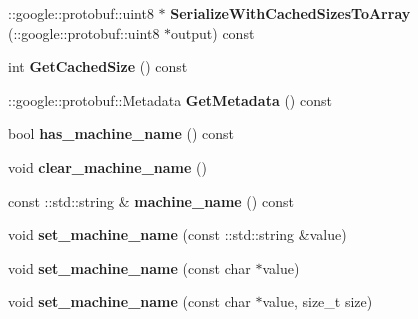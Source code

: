 \begin{DoxyCompactItemize}
\item 
\hypertarget{classmachines_1_1Machine_a34a75799ebb229a2d1661e2607cd1b3f}{\-::google\-::protobuf\-::uint8 $\ast$ {\bfseries Serialize\-With\-Cached\-Sizes\-To\-Array} (\-::google\-::protobuf\-::uint8 $\ast$output) const }\label{classmachines_1_1Machine_a34a75799ebb229a2d1661e2607cd1b3f}

\item 
\hypertarget{classmachines_1_1Machine_a648152e9c2f16354f92ca10795e60597}{int {\bfseries Get\-Cached\-Size} () const }\label{classmachines_1_1Machine_a648152e9c2f16354f92ca10795e60597}

\item 
\hypertarget{classmachines_1_1Machine_a3421c3b065c0c0ca06f9b409511770fb}{\-::google\-::protobuf\-::\-Metadata {\bfseries Get\-Metadata} () const }\label{classmachines_1_1Machine_a3421c3b065c0c0ca06f9b409511770fb}

\item 
\hypertarget{classmachines_1_1Machine_aca9cbce4f166059155ab7337a2afe659}{bool {\bfseries has\-\_\-machine\-\_\-name} () const }\label{classmachines_1_1Machine_aca9cbce4f166059155ab7337a2afe659}

\item 
\hypertarget{classmachines_1_1Machine_a386297eb173a27367add5881c27c135d}{void {\bfseries clear\-\_\-machine\-\_\-name} ()}\label{classmachines_1_1Machine_a386297eb173a27367add5881c27c135d}

\item 
\hypertarget{classmachines_1_1Machine_ac5406a528c03ef52f648a7be22bc3ddb}{const \-::std\-::string \& {\bfseries machine\-\_\-name} () const }\label{classmachines_1_1Machine_ac5406a528c03ef52f648a7be22bc3ddb}

\item 
\hypertarget{classmachines_1_1Machine_a0fedd690134fc36e5311dbebb6e67394}{void {\bfseries set\-\_\-machine\-\_\-name} (const \-::std\-::string \&value)}\label{classmachines_1_1Machine_a0fedd690134fc36e5311dbebb6e67394}

\item 
\hypertarget{classmachines_1_1Machine_ab5862d9d7cc77756d591e2cb13f1877a}{void {\bfseries set\-\_\-machine\-\_\-name} (const char $\ast$value)}\label{classmachines_1_1Machine_ab5862d9d7cc77756d591e2cb13f1877a}

\item 
\hypertarget{classmachines_1_1Machine_a2a488a882549497334e7c118ac6dbdef}{void {\bfseries set\-\_\-machine\-\_\-name} (const char $\ast$value, size\-\_\-t size)}\label{classmachines_1_1Machine_a2a488a882549497334e7c118ac6dbdef}


\end{DoxyCompactItemize}
